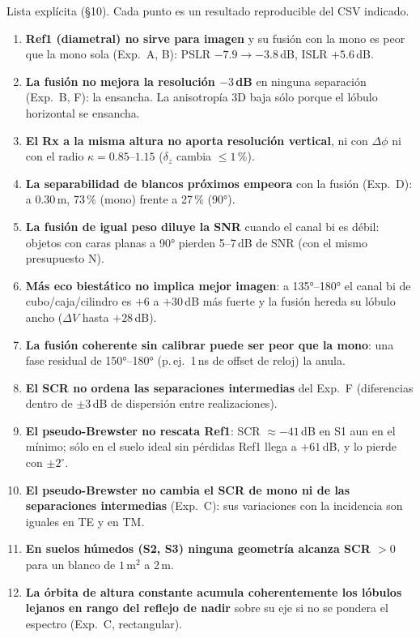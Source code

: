 Lista explícita (§10). Cada punto es un resultado reproducible del CSV indicado.
\begin{enumerate}[itemsep=3pt]
  \item \textbf{Ref1 (diametral) no sirve para imagen} y su fusión con la mono es
  peor que la mono sola (Exp.~A, B): PSLR $-7.9\to-3.8$\,dB, ISLR $+5.6$\,dB.
  \item \textbf{La fusión no mejora la resolución $-3$\,dB} en ninguna separación
  (Exp.~B, F): la ensancha. La anisotropía 3D baja sólo porque el lóbulo
  horizontal se ensancha.
  \item \textbf{El Rx a la misma altura no aporta resolución vertical}, ni con
  $\Delta\phi$ ni con el radio $\kappa=0.85$--$1.15$ ($\delta_z$ cambia $\le1$\,\%).
  \item \textbf{La separabilidad de blancos próximos empeora} con la fusión
  (Exp.~D): a 0.30\,m, 73\,\% (mono) frente a 27\,\% (90°).
  \item \textbf{La fusión de igual peso diluye la SNR} cuando el canal bi es débil:
  objetos con caras planas a 90° pierden 5--7\,dB de SNR (con el mismo presupuesto N).
  \item \textbf{Más eco biestático no implica mejor imagen}: a 135°--180° el canal bi
  de cubo/caja/cilindro es $+6$ a $+30$\,dB más fuerte y la fusión hereda su lóbulo
  ancho ($\Delta V$ hasta $+28$\,dB).
  \item \textbf{La fusión coherente sin calibrar puede ser peor que la mono}: una fase
  residual de 150°--180° (p.\,ej.\ 1\,ns de offset de reloj) la anula.
  \item \textbf{El SCR no ordena las separaciones intermedias} del Exp.~F (diferencias
  dentro de $\pm3$\,dB de dispersión entre realizaciones).
  \item \textbf{El pseudo-Brewster no rescata Ref1}: SCR $\approx-41$\,dB en S1 aun en el
  mínimo; sólo en el suelo ideal sin pérdidas Ref1 llega a $+61$\,dB, y lo pierde con $\pm2^{\circ}$.
  \item \textbf{El pseudo-Brewster no cambia el SCR de mono ni de las separaciones intermedias}
  (Exp.~C): sus variaciones con la incidencia son iguales en TE y en TM.
  \item \textbf{En suelos húmedos (S2, S3) ninguna geometría alcanza SCR $>0$} para un blanco
  de $1\,\mathrm{m}^2$ a 2\,m.
  \item \textbf{La órbita de altura constante acumula coherentemente los lóbulos lejanos en rango
  del reflejo de nadir} sobre su eje si no se pondera el espectro (Exp.~C, rectangular).

\end{enumerate}
